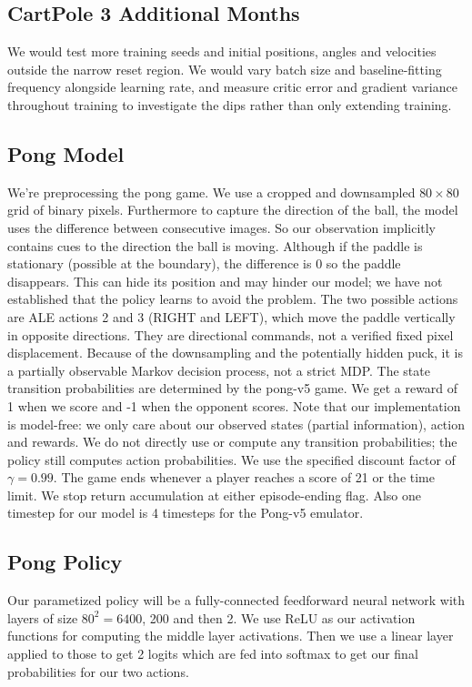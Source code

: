 \documentclass{article}
\begin{document}
\subsection{CartPole 3 Additional Months}
We would test more training seeds and initial positions, angles and velocities outside the narrow reset region. We would vary batch size and baseline-fitting frequency alongside learning rate, and measure critic error and gradient variance throughout training to investigate the dips rather than only extending training.

\subsection{Pong Model}
We're preprocessing the pong game. We use a cropped and downsampled $80\times 80$ grid of binary pixels. Furthermore to capture the direction of the ball, the model uses the difference between consecutive images. So our observation implicitly contains cues to the direction the ball is moving. Although if the paddle is stationary (possible at the boundary), the difference is 0 so the paddle disappears. This can hide its position and may hinder our model; we have not established that the policy learns to avoid the problem. The two possible actions are ALE actions 2 and 3 (RIGHT and LEFT), which move the paddle vertically in opposite directions. They are directional commands, not a verified fixed pixel displacement. Because of the downsampling and the potentially hidden puck, it is a partially observable Markov decision process, not a strict MDP. The state transition probabilities are determined by the pong-v5 game. We get a reward of 1 when we score and -1 when the opponent scores. Note that our implementation is model-free: we only care about our observed states (partial information), action and rewards. We do not directly use or compute any transition probabilities; the policy still computes action probabilities. We use the specified discount factor of $\gamma=0.99$. The game ends whenever a player reaches a score of 21 or the time limit. We stop return accumulation at either episode-ending flag. Also one timestep for our model is 4 timesteps for the Pong-v5 emulator.

\subsection{Pong Policy}
Our parametized policy will be a fully-connected feedforward neural network with layers of size $80^2=6400$, 200 and then 2. We use ReLU as our activation functions for computing the middle layer activations. Then we use a linear layer applied to those to get 2 logits which are fed into softmax to get our final probabilities for our two actions.
\end{document}
